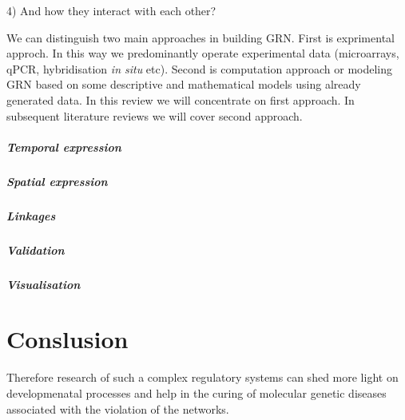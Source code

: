 \documentclass[a4paper, twoside]{report}
\begin{document}
4) And how they interact with each other?

\vspace{2mm}

We can distinguish two main approaches in building GRN. First is exprimental approch. In this way we predominantly operate experimental data (microarrays, qPCR, hybridisation \textit{in situ} etc). Second is computation approach or modeling GRN based on some descriptive and mathematical models using already generated data. In this review we will concentrate on first approach. In subsequent literature reviews we will cover second approach.

\subparagraph{Temporal expression}

\subparagraph{Spatial expression}

\subparagraph{Linkages}

\subparagraph{Validation}

\subparagraph{Visualisation}

\section*{Conslusion}


Therefore research of such a complex regulatory systems can shed more light on developmenatal processes and help in the curing of molecular genetic diseases associated with the violation of the networks.



\end{document}
